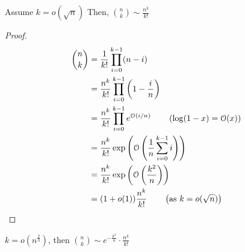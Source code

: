 \begin{lemma}
    Assume $k = o(\sqrt{n})$ Then, $\binom{n}{k} \sim \frac{n^k}{k!}$
\end{lemma}
\begin{proof}
    \begin{align*}
        \binom{n}{k} &= \frac{1}{k!}\prod_{i = 0}^{k - 1} (n - i) \\
        &= \frac{n^k}{k!}\prod_{i = 0}^{k - 1} \left(1 - \frac{i}{n}\right) \\
        &= \frac{n^k}{k!}\prod_{i = 0}^{k - 1} e^{\operatorname{\mathcal{O}}(i/n)} \qquad \left(\log(1 - x) = \operatorname{\mathcal{O}}(x)\right)\\
        &= \frac{n^k}{k!} \exp\left(\operatorname{\mathcal{O}}\left(\frac{1}{n}\sum_{i = 0}^{k - 1} i\right)\right) \\
        &= \frac{n^k}{k!} \exp\left(\operatorname{\mathcal{O}}\left(\frac{k^2}{n}\right)\right) \\
        &= (1 + o(1))\frac{n^k}{k!} \qquad \left(\text{as $k = o(\sqrt{n})$}\right)
    \end{align*}
\end{proof}

\begin{remark}
    $k = o\left(n^{\frac{2}{3}}\right)$, then $\binom{n}{k} \sim e^{-\frac{k^2}{n}}\cdot\frac{n^k}{k!}$
\end{remark}